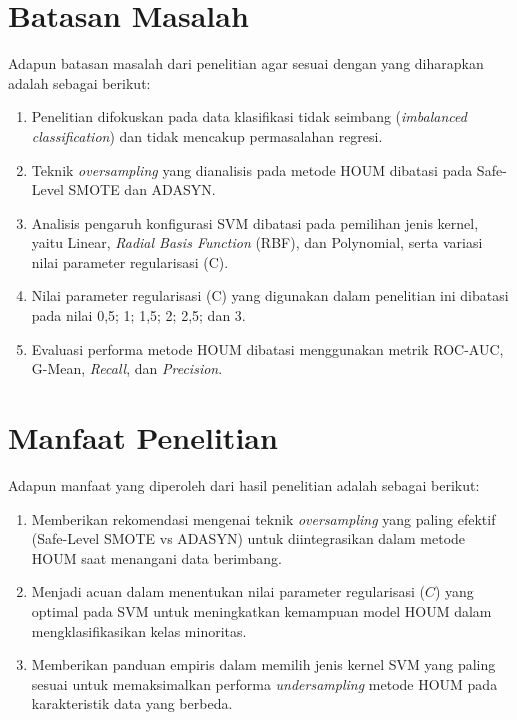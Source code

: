 \section{Batasan Masalah} \label{I.Batasan}
Adapun batasan masalah dari penelitian  agar sesuai dengan yang diharapkan adalah sebagai berikut: \par

\begin{enumerate}[noitemsep]
    \item Penelitian difokuskan pada data klasifikasi tidak seimbang (\textit{imbalanced classification}) dan tidak mencakup permasalahan regresi.
    \item Teknik \textit{oversampling} yang dianalisis pada metode HOUM dibatasi pada Safe-Level SMOTE dan ADASYN.
    \item Analisis pengaruh konfigurasi SVM dibatasi pada pemilihan jenis kernel, yaitu Linear, \textit{Radial Basis Function} (RBF), dan Polynomial, serta variasi nilai parameter regularisasi (C).
    \item Nilai parameter regularisasi (C) yang digunakan dalam penelitian ini dibatasi pada nilai 0,5; 1; 1,5; 2; 2,5; dan 3.
    \item Evaluasi performa metode HOUM dibatasi menggunakan metrik ROC-AUC, G-Mean, \textit{Recall}, dan \textit{Precision}.
\end{enumerate}


\section{Manfaat Penelitian} \label{I.Manfaat}
Adapun manfaat yang diperoleh dari hasil penelitian adalah sebagai berikut: \par

\begin{enumerate}[noitemsep]
    \item Memberikan rekomendasi mengenai teknik \textit{oversampling} yang paling efektif (Safe-Level SMOTE vs ADASYN) untuk diintegrasikan dalam metode HOUM saat menangani data berimbang.
    \item Menjadi acuan dalam menentukan nilai parameter regularisasi ($C$) yang optimal pada SVM untuk meningkatkan kemampuan model HOUM dalam mengklasifikasikan kelas minoritas.
    \item Memberikan panduan empiris dalam memilih jenis kernel SVM yang paling sesuai untuk memaksimalkan performa \textit{undersampling} metode HOUM pada karakteristik data yang berbeda.
\end{enumerate}


